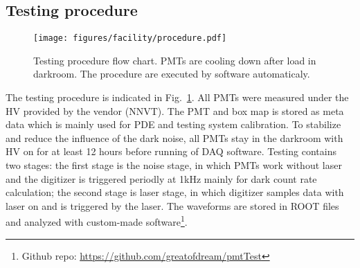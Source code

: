 \subsection{Testing procedure}
\begin{figure}
    \centering
    \texttt{[image: figures/facility/procedure.pdf]}
    \caption{Testing procedure flow chart. PMTs are cooling down after load in darkroom. The procedure are executed by software automaticaly.}
    \label{fig:testingprocedure}
\end{figure}

The testing procedure is indicated in Fig.~\ref{fig:testingprocedure}. All PMTs were measured under the HV provided by the vendor (NNVT).%
The PMT and box map is stored as meta data which is mainly used for PDE and testing system calibration. To stabilize and reduce the influence of the dark noise, all PMTs stay in the darkroom with HV on for at least 12 hours before running of DAQ software. Testing contains two stages: the first stage is the noise stage, in which PMTs work without laser and the digitizer is triggered periodly at 1kHz mainly for dark count rate calculation; the second stage is laser stage, in which digitizer samples data with laser on and is triggered by the laser. The waveforms are stored in ROOT files and analyzed with custom-made software\footnote{Github repo: \url{https://github.com/greatofdream/pmtTest}}.